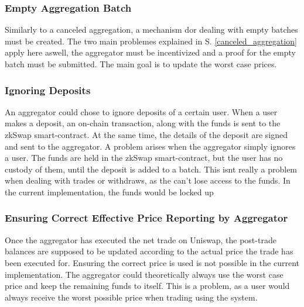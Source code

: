 \documentclass[../../thesis.tex]{subfiles}
\begin{document}
\subsubsection{Empty Aggregation Batch}
Similarly to a canceled aggregation, a mechanism dor dealing with empty batches must be created. The two main problemes explained in S. \ref{canceled_aggregation} apply here aswell, the aggregator must be incentivized and a proof for the empty batch must be submitted. The main goal is to update the worst case prices. 

\subsubsection{Ignoring Deposits}
An aggregator could chose to ignore deposits of a certain user. When a user makes a deposit, an on-chain transaction, along with the funds is sent to the zkSwap smart-contract. At the same time, the details of the deposit are signed and sent to the aggregator. A problem arises when the aggregator simply ignores a user. The funds are held in the zkSwap smart-contract, but the user has no custody of them, until the deposit is added to a batch. This isnt really a problem when dealing with trades or withdraws, as the can't lose access to the funds. In the current implementation, the funds would be locked up 

\subsubsection{Ensuring Correct Effective Price Reporting by Aggregator}
Once the aggregator has executed the net trade on Uniswap, the post-trade balances are supposed to be updated according to the actual price the trade has been executed for. Ensuring the correct price is used is not possible in the current implementation. The aggregator could theoretically always use the worst case price and keep the remaining funds to itself. This is a problem, as a user would always receive the worst possible price when trading using the system. 
\end{document}
